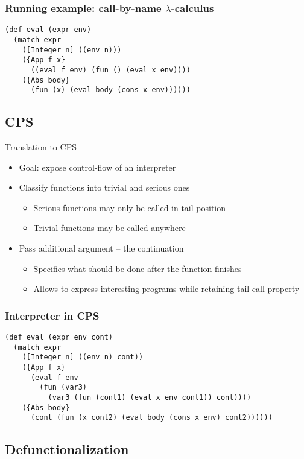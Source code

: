 \documentclass{beamer}
\newcommand{\LC}{\(\lambda\)-calculus}
\begin{document}
\begin{frame}[fragile]
\frametitle{Running example: call-by-name \LC{}}
\begin{lstlisting}
(def eval (expr env)
  (match expr
    ([Integer n] ((env n)))
    ({App f x}
      ((eval f env) (fun () (eval x env))))
    ({Abs body}
      (fun (x) (eval body (cons x env))))))
\end{lstlisting}
\end{frame}


\subsection{CPS}

\begin{frame}{Translation to CPS}
  \begin{itemize}
    \item Goal: expose control-flow of an interpreter
    \item Classify functions into trivial and serious ones
    \begin{itemize}
      \item Serious functions may only be called in tail position
      \item Trivial functions may be called anywhere
    \end{itemize}
    \item Pass additional argument -- the continuation
    \begin{itemize}
      \item Specifies what should be done after the function finishes
      \item Allows to express interesting programs while retaining tail-call property
    \end{itemize}
  \end{itemize}
\end{frame}

\begin{frame}[fragile]
  \frametitle{Interpreter in CPS}
  \begin{lstlisting}
(def eval (expr env cont)
  (match expr
    ([Integer n] ((env n) cont))
    ({App f x}
      (eval f env
        (fun (var3)
          (var3 (fun (cont1) (eval x env cont1)) cont))))
    ({Abs body}
      (cont (fun (x cont2) (eval body (cons x env) cont2))))))
  \end{lstlisting}
\end{frame}

\subsection{Defunctionalization}
\end{document}
